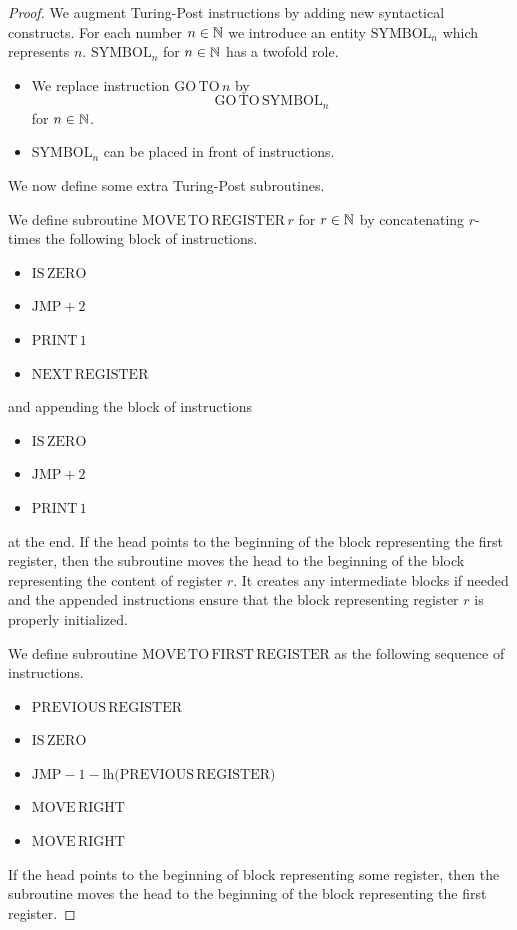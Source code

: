 \documentclass[10pt]{amsart}
\begin{document}
\begin{proof}
	We augment Turing-Post instructions by adding new syntactical constructs. For each number $n \in {\mathbb N}$ we introduce an entity $\mathrm{SYMBOL}_n$ which represents $n$. $\mathrm{SYMBOL}_n$ for $n \in {\mathbb N}$ has a twofold role.
	\begin{itemize}
		\item We replace instruction $\mathrm{GO\,TO}\,n$ by
		      $$\mathrm{GO\,TO}\,\mathrm{SYMBOL}_n$$
		      for $n\in {\mathbb N}$.
		\item $\mathrm{SYMBOL}_n$ can be placed in front of instructions.
	\end{itemize}
	We now define some extra Turing-Post subroutines.

	We define subroutine $\mathrm{MOVE\,TO\,REGISTER\,}r$ for $r \in {\mathbb N}$ by concatenating $r$-times the following block of instructions.
	\begin{itemize}
		\item[] $\mathrm{IS\,ZERO}$
		\item[] $\mathrm{JMP}+2$
		\item[] $\mathrm{PRINT\,}1$
		\item[] $\mathrm{NEXT\,REGISTER}$
	\end{itemize}
	and appending the block of instructions
	\begin{itemize}
		\item[] $\mathrm{IS\,ZERO}$
		\item[] $\mathrm{JMP}+2$
		\item[] $\mathrm{PRINT\,}1$
	\end{itemize}
	at the end. If the head points to the beginning of the block representing the first register, then the subroutine moves the head to the beginning of the block representing the content of register $r$. It creates any intermediate blocks if needed and the appended instructions ensure that the block representing register $r$ is properly initialized.

	We define subroutine $\mathrm{MOVE\,TO\,FIRST\,REGISTER}$ as the following sequence of instructions.
	\begin{itemize}
		\item[] $\mathrm{PREVIOUS\,REGISTER}$
		\item[] $\mathrm{IS\,ZERO}$
		\item[] $\mathrm{JMP}-1 - \mathrm{lh}\big(\mathrm{PREVIOUS\,REGISTER}\big)$
		\item[] $\mathrm{MOVE\,RIGHT}$
		\item[] $\mathrm{MOVE\,RIGHT}$
	\end{itemize}
	If the head points to the beginning of block representing some register, then the subroutine moves the head to the beginning of the block representing the first register.


\end{proof}
\end{document}
